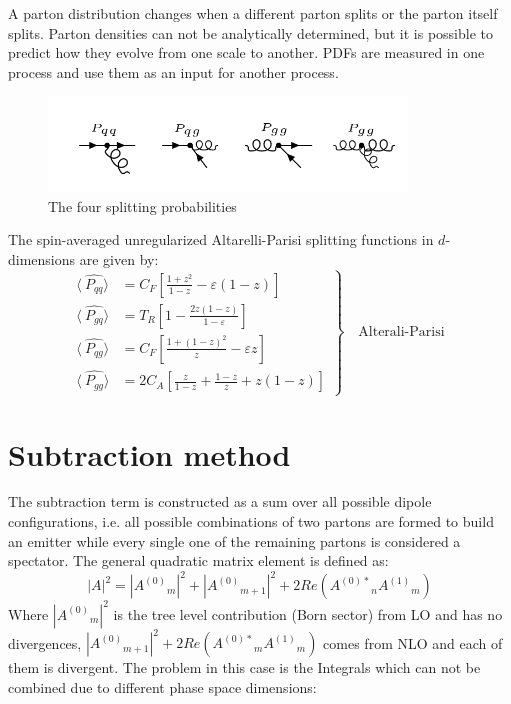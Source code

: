 A parton distribution changes when a different parton splits or the parton itself splits. Parton densities can not be analytically determined, but it is possible to predict how they evolve from one scale to another. PDFs are measured in one process and use them as an input for another process.


\begin{figure}[h!]
\centering
\includegraphics[width=0.85\textwidth]{images/Intro/spiliting.png}
\caption{The four splitting probabilities}
\label{splitting}
\end{figure}
The  spin-averaged  unregularized  Altarelli-Parisi  splitting  functions  in $ d $-dimensions  are given by:
\begin{equation}
	\left.\begin{aligned}
\langle\:\hat{P_{qq}}\rangle &= C_F[\frac{1+z^2}{1-z}-\varepsilon(1-z)]\\
\langle\:\hat{P_{gq}}\rangle &= T_R[1-\frac{2z(1-z)}{1-\varepsilon}]\\
\langle\:\hat{P_{qg}}\rangle &= C_F[\frac{1+(1-z)^2}{z}-\varepsilon z]\\
\langle\:\hat{P_{gg}}\rangle &= 2C_A[\frac{z}{1-z}+\frac{1-z}{z}+z(1-z)]
\end{aligned}
	\right\}
	\quad \text{Alterali-Parisi
	}
\label{Alterali-Parisi}
\end{equation}


\section{Subtraction method}
The subtraction term is constructed as a sum over all possible dipole configurations, i.e. all possible combinations of two partons are formed to build an emitter while every single one of the remaining partons is considered a spectator. The general quadratic matrix element is defined as:
\begin{equation}
|A|^2 = |{A^{(0)}}_m|^2 +  |{A^{(0)}}_{m+1}|^2+ 2Re({A^{(0)*}}_{n}{A^{(1)}}_{m})
\end{equation}
Where $ |{A^{(0)}}_m|^2 $ is the tree level contribution (Born sector) from LO and has no divergences, $ |{A^{(0)}}_{m+1}|^2+ 2Re({A^{(0)*}}_{m}{A^{(1)}}_{m}) $ comes from NLO and each of them is divergent. The problem in this case is the Integrals which can not be combined due to different phase space dimensions:

